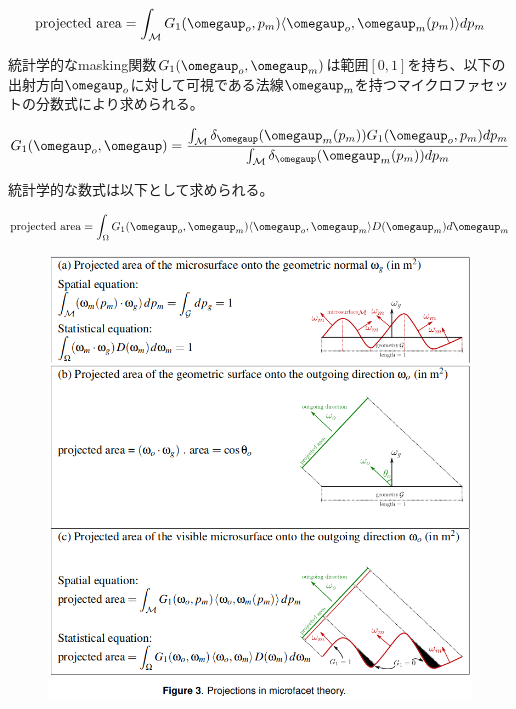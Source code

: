 \documentclass[a4paper,xelatex,ja=standard]{bxjsarticle}
\begin{document}
\begin{equation}
    \text{projected area} = \int_\mathcal{M} G_1(\boldsymbol{\omegaup}_o, p_m) \langle \boldsymbol{\omegaup}_o, \boldsymbol{\omegaup}_m(p_m) \rangle dp_m
    \label{eq:11}
\end{equation}

統計学的なmasking関数$G_1(\boldsymbol{\omegaup}_o, \boldsymbol{\omegaup}_m)$は範囲$[0, 1]$を持ち、以下の出射方向$\boldsymbol{\omegaup}_o$に対して可視である法線$\boldsymbol{\omegaup}_m$を持つマイクロファセットの分数式により求められる。

\begin{equation}
    G_1(\boldsymbol{\omegaup}_o, \boldsymbol{\omegaup}) = \frac{\int_\mathcal{M}\delta_{\boldsymbol{\omegaup}}(\boldsymbol{\omegaup}_m(p_m))G_1(\boldsymbol{\omegaup}_o, p_m)dp_m}{\int_\mathcal{M}\delta_{\boldsymbol{\omegaup}}(\boldsymbol{\omegaup}_m(p_m))dp_m}
    \label{eq:12}
\end{equation}

統計学的な数式は以下として求められる。

\begin{equation}
    \text{projected area} = \int_\Omega G_1(\boldsymbol{\omegaup}_o, \boldsymbol{\omegaup}_m) \langle \boldsymbol{\omegaup}_o, \boldsymbol{\omegaup}_m \rangle D(\boldsymbol{\omegaup}_m) d\boldsymbol{\omegaup}_m
    \label{eq:13}
\end{equation}

\begin{figure}
    \includegraphics[width=\textwidth]{Figure3.png}
    \caption{}
    \label{fig:3}
\end{figure}
\end{document}
